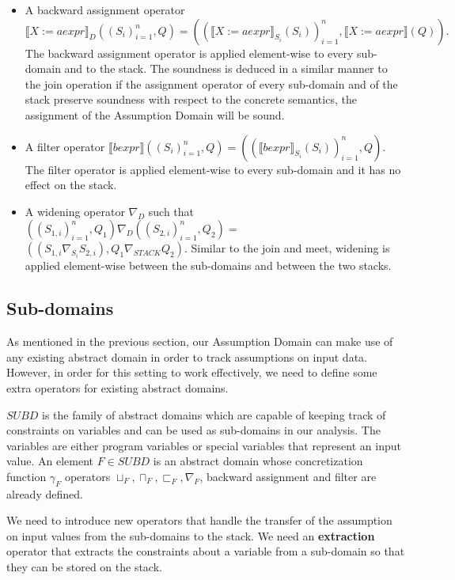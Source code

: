 \documentclass[10pt]{report}
\begin{document}
\begin{itemize}
	\item A backward assignment operator $\llbracket X:=aexpr \rrbracket_{D} ((S_{i})_{i=1}^{n}, Q) =  ((\llbracket X:=aexpr \rrbracket_{S_{i}}(S_{i}))_{i=1}^{n}, \llbracket X:= aexpr \rrbracket(Q)).$ The backward assignment operator is applied element-wise to every sub-domain and to the stack. The soundness is deduced in a similar manner to the join operation if the assignment operator of every sub-domain and of the stack preserve soundness with respect to the concrete semantics, the assignment of the Assumption Domain will be sound.
	\item A filter operator $ \llbracket bexpr \rrbracket ((S_{i})_{i=1}^{n}, Q) =  ((\llbracket bexpr \rrbracket_{S_{i}}(S_{i}))_{i=1}^{n}, Q). $ The filter operator is applied element-wise to every sub-domain and it has no effect on the stack. 
	\item A widening operator $\nabla_{D}$ such that $ ((S_{1,i})_{i=1}^{n}, Q_{1}) \nabla_{D} ((S_{2,i})_{i=1}^{n}, Q_{2}) = $ $ ((S_{1, i} \nabla_{S_{i}} S_{2,i}), Q_{1} \nabla_{STACK} Q_{2}) .$ Similar to the join and meet, widening is applied element-wise between the sub-domains and between the two stacks. 
\end{itemize}

\subsection{Sub-domains} \label{sub-domains}

As mentioned in the previous section, our Assumption Domain can make use of any existing abstract domain in order to track assumptions on input data. However, in order for this setting to work effectively, we need to define some extra operators for existing abstract domains. 

$SUBD$ is the family of abstract domains which are capable of keeping track of constraints on variables and can be used as sub-domains in our analysis. The variables are either program variables or special variables that represent an input value. An element $F \in SUBD$ is an abstract domain whose concretization function $\gamma_{F}$ operators $\sqcup_{F}, \sqcap_{F}, \sqsubset_{F}, \nabla_{F}$, backward assignment and filter are already defined. 

We need to introduce new operators that handle the transfer of the assumption on input values from the sub-domains to the stack. We need an \textbf{extraction} operator that extracts the constraints about a variable from a sub-domain so that they can be stored on the stack. 
\end{document}
